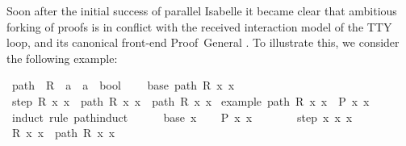 \begin{isabellebody}
\begin{isamarkuptext}
  \medskip Soon after the initial success of parallel Isabelle it
  became clear that ambitious forking of proofs is in conflict with
  the received interaction model of the TTY loop, and its canonical
  front-end Proof~General \cite{Aspinall:TACAS:2000}.  To illustrate
  this, we consider the following example:%
\end{isamarkuptext}%
\isamarkuptrue%
\isamarkupfalse%
\ path\ \ R\ {\isacharcolon}{\isacharcolon}\ {\isachardoublequoteopen}{\isacharprime}a\ {\isasymRightarrow}\ {\isacharprime}a\ {\isasymRightarrow}\ bool{\isachardoublequoteclose}\ \ %
\isanewline
{}\isanewline
\ \ base{\isacharcolon}\ {\isachardoublequoteopen}path\ R\ x\ x\isanewline
{\isacharbar}\ step{\isacharcolon}\ {\isachardoublequoteopen}R\ x\ x\ {\isasymLongrightarrow}\ path\ R\ x\ x\ {\isasymLongrightarrow}\ path\ R\ x\ x\isanewline
\isanewline
{}\isamarkupfalse%
\ example{\isacharcolon}\ {\isachardoublequoteopen}path\ R\ x\ x\ {\isasymLongrightarrow}\ P\ x\ x\isanewline
%
\isadelimproof
%
\endisadelimproof
%
\isatagproof
{}\isamarkupfalse%
\ {\isacharparenleft}induct\ rule{\isacharcolon}\ path{\isachardot}induct{\isacharparenright}\ \ %
\isanewline
\ \ \isamarkupfalse%
\ {\isacharparenleft}base\ x\isanewline
\ \ \isamarkupfalse%
\ {\isachardoublequoteopen}P\ x\ x\ \isamarkupfalse%
\ \ %
\isanewline
{}\isamarkupfalse%
\isanewline
\ \ \isamarkupfalse%
\ {\isacharparenleft}step\ x\ x\ x\isanewline
\ \ \isamarkupfalse%
\ {\isacharbackquoteopen}R\ x\ x\ \ {\isacharbackquoteopen}path\ R\ x\ x\isanewline

\end{isabellebody}
